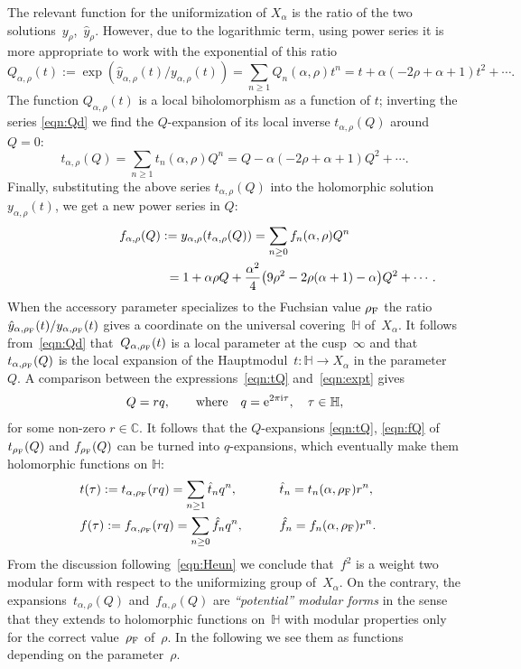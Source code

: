 \documentclass[pdftex]{sigma}
\newcommand{\C}{\mathbb{C}}
\newcommand{\Po}{\mathbb{H}}
\numberwithin{equation}{section}
\begin{document}
The relevant function for the uniformization of $X_\alpha$ is the ratio of the two solutions~$y_\rho$,~$\hat{y}_\rho$. However, due to the logarithmic term, using power series it is more appropriate to work with the exponential of this ratio
\begin{equation}\label{eqn:Qd}
Q_{\alpha,\rho}(t):=\exp(\hat{y}_{\alpha,\rho}(t)/y_{\alpha,\rho}(t))=\sum_{n\ge 1}{Q_n(\alpha,\rho)t^n}= t+\alpha(-2\rho+\alpha+1)t^2+\cdots.
\end{equation}
The function $Q_{\alpha,\rho}(t)$ is a local biholomorphism as a function of $t$; inverting the series \eqref{eqn:Qd} we find the $Q$-expansion of its local inverse $t_{\alpha,\rho}(Q)$ around $Q=0$:
\begin{equation}\label{eqn:tQ}
t_{\alpha,\rho}(Q)=\sum_{n\ge1}{{t}_n(\alpha,\rho)Q^n}=Q-\alpha(-2\rho+\alpha+1)Q^2+\cdots.
\end{equation}
Finally, substituting the above series $t_{\alpha,\rho}(Q)$ into the holomorphic solution $y_{\alpha,\rho}(t)$, we get a new power series in $Q$:
\begin{gather}
f_{\alpha,\rho}(Q):=y_{\alpha,\rho}(t_{\alpha,\rho}(Q))=\sum_{n\ge 0}{{f}_n(\alpha,\rho)Q^n}\nonumber\\
\hphantom{f_{\alpha,\rho}(Q):=y_{\alpha,\rho}(t_{\alpha,\rho}(Q))}{}
= 1+\alpha\rho{Q}+\frac{\alpha^2}{4}\big(9\rho^2-2\rho(\alpha+1)-\alpha\big)Q^2+\cdots.\label{eqn:fQ}
\end{gather}
When the accessory parameter specializes to the Fuchsian value $\rho_{\rm F}$ the ratio $\hat{y}_{\alpha,\rho_{\rm F}}(t)/y_{\alpha,\rho_{\rm F}}(t)$ gives a coordinate on the universal covering~$\Po$ of~$X_\alpha$.
It follows from~\eqref{eqn:Qd} that~$Q_{\alpha,\rho_{\rm F}}(t)$ is a local parameter at the cusp~$\infty$ and that~$t_{\alpha,\rho_{\rm F}}(Q)$ is the local expansion of the Hauptmodul~$t\colon\Po\to X_\alpha$ in the parameter~$Q$.
A comparison between the expressions~\eqref{eqn:tQ} and~\eqref{eqn:expt} gives
\begin{equation}\label{eqn:newdefr}
Q=rq,\qquad\text{where}\quad q={\rm e}^{2\pi {\rm i}\tau}, \quad \tau\in\Po,
\end{equation}
for some non-zero $r \in \C$.
It follows that the $Q$-expansions \eqref{eqn:tQ}, \eqref{eqn:fQ} of $t_{\rho_{\rm F}}(Q)$ and $f_{\rho_{\rm F}}(Q)$ can be turned into $q$-expansions, which eventually make them holomorphic functions on $\Po$:
\begin{alignat*}{3}
& t(\tau):=t_{\alpha,\rho_{\rm F}}(rq)=\sum_{n\ge 1}{\hat{t}_nq^n},\qquad&& \hat{t}_n={t}_n(\alpha,\rho_{\rm F})r^n,&\\
& f(\tau):=f_{\alpha,\rho_{\rm F}}(rq)=\sum_{n\ge 0}{\hat{f}_nq^n},\qquad && \hat{f}_n={f}_n(\alpha,\rho_{\rm F})r^n.&
\end{alignat*}
From the discussion following~\eqref{eqn:Heun} we conclude that~$f^2$ is a weight two modular form with respect to the uniformizing group of~$X_\alpha$. On the contrary, the expansions~$t_{\alpha,\rho}(Q)$ and~$f_{\alpha,\rho}(Q)$ are \emph{``potential'' modular forms} in the sense that they extends to holomorphic functions on~$\Po$ with modular properties only for the correct value~$\rho_{\rm F}$ of~$\rho$. In the following we see them as functions depending on the parameter~$\rho$.
\end{document}
